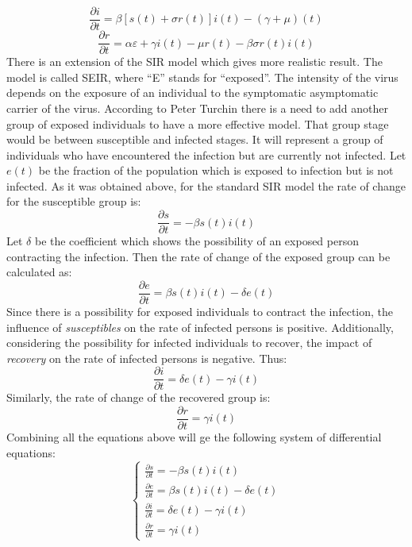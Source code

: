 \begin{equation*}
    \frac{\partial i}{\partial t} = \beta[s(t) + \sigma r(t)]i(t) - (\gamma + \mu)(t)
\end{equation*}
\begin{equation*}
    \frac{\partial r}{\partial t} = \alpha \varepsilon + \gamma i(t) - \mu r(t) - \beta \sigma r(t)i(t)
\end{equation*}
\hspace{\parindent}There is an extension of the SIR model which gives more realistic result.
The model is called SEIR, where ``E'' stands for ``exposed''.
The intensity of the virus depends on the exposure of an individual to the symptomatic asymptomatic carrier of the virus.
According to Peter Turchin there is a need to add another group of exposed individuals to have a more effective model.
That group stage would be between susceptible and infected stages.
It will represent a group of individuals who have encountered the infection but are currently not infected.
Let $e(t)$ be the fraction of the population which is exposed to infection but is not infected.
As it was obtained above, for the standard SIR model the rate of change for the susceptible group is:
\begin{equation*}
    \frac{\partial s}{\partial t} = -\beta s(t)  i(t)
\end{equation*}
Let $\delta$ be the coefficient which shows the possibility of an exposed person contracting the infection.
Then the rate of change of the exposed group can be calculated as:
\begin{equation*}
    \frac{\partial e}{\partial t} = \beta s(t)  i(t) - \delta e(t)
\end{equation*}
Since there is a possibility for exposed individuals to contract the infection, the influence of \textit{susceptibles} on the rate of infected persons is positive.
Additionally, considering the possibility for infected individuals to recover, the impact of \textit{recovery} on the rate of infected persons is negative.
Thus:
\begin{equation*}
    \frac{\partial i}{\partial t} = \delta e(t) - \gamma i(t)
\end{equation*}
Similarly, the rate of change of the recovered group is:
\begin{equation*}
    \frac{\partial r}{\partial t} = \gamma i(t)
\end{equation*}
Combining all the equations above will ge the following system of differential equations:
\[
\left\{
    \begin{array}{l}
        \frac{\partial s}{\partial t} = -\beta s(t)  i(t)\\
        \frac{\partial e}{\partial t} = \beta s(t)  i(t) - \delta e(t)\\
        \frac{\partial i}{\partial t} = \delta e(t) - \gamma i(t)\\
        \frac{\partial r}{\partial t} = \gamma i(t)
    \end{array}
\right.
\]
